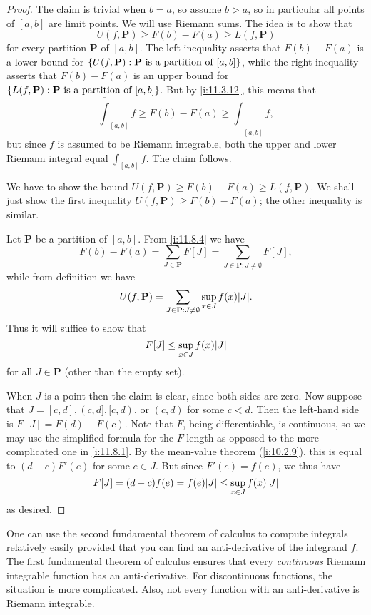 \begin{proof}
  The claim is trivial when \(b = a\), so assume \(b > a\), so in particular all points of \([a, b]\) are limit points.
  We will use Riemann sums.
  The idea is to show that
  \[
    U(f, \mathbf{P}) \geq F(b) - F(a) \geq L(f, \mathbf{P})
  \]
  for every partition \(\mathbf{P}\) of \([a, b]\).
  The left inequality asserts that \(F(b) - F(a)\) is a lower bound for \(\left\lbrace U(f, \mathbf{P}) : \mathbf{P} \text{ is a partition of } [a, b]\right\rbrace\), while the right inequality asserts that \(F(b) - F(a)\) is an upper bound for \(\left\lbrace L(f, \mathbf{P}) : \mathbf{P} \text{ is a partition of } [a, b]\right\rbrace\).
  But by \cref{i:11.3.12}, this means that
  \[
    \overline{\int}_{[a, b]} f \geq F(b) - F(a) \geq \underline{\int}_{[a, b]} f,
  \]
  but since \(f\) is assumed to be Riemann integrable, both the upper and lower Riemann integral equal \(\int_{[a, b]} f\).
  The claim follows.

  We have to show the bound \(U(f, \mathbf{P}) \geq F(b) - F(a) \geq L(f, \mathbf{P})\).
  We shall just show the first inequality \(U(f, \mathbf{P}) \geq F(b) - F(a)\);
  the other inequality is similar.

  Let \(\mathbf{P}\) be a partition of \([a, b]\).
  From \cref{i:11.8.4} we have
  \[
    F(b) - F(a) = \sum_{J \in \mathbf{P}} F[J] = \sum_{J \in \mathbf{P} : J \neq \emptyset} F[J],
  \]
  while from definition we have
  \[
    U(f, \mathbf{P}) = \sum_{J \in \mathbf{P} : J \neq \emptyset} \sup_{x \in J} f(x) \abs{J}.
  \]
  Thus it will suffice to show that
  \[
    F[J] \leq \sup_{x \in J} f(x) \abs{J}
  \]
  for all \(J \in \mathbf{P}\)
  (other than the empty set).

  When \(J\) is a point then the claim is clear, since both sides are zero.
  Now suppose that \(J = [c, d], (c, d], [c, d)\), or \((c, d)\) for some \(c < d\).
  Then the left-hand side is \(F[J] = F(d) - F(c)\).
  Note that \(F\), being differentiable, is continuous, so we may use the simplified formula for the \(F\)-length as opposed to the more complicated one in \cref{i:11.8.1}.
  By the mean-value theorem (\cref{i:10.2.9}), this is equal to \((d - c) F'(e)\) for some \(e \in J\).
  But since \(F'(e) = f(e)\), we thus have
  \[
    F[J] = (d - c) f(e) = f(e) \abs{J} \leq \sup_{x \in J} f(x) \abs{J}
  \]
  as desired.
\end{proof}

\begin{note}
  One can use the second fundamental theorem of calculus to compute integrals relatively easily provided that you can find an anti-derivative of the integrand \(f\).
  The first fundamental theorem of calculus ensures that every \emph{continuous} Riemann integrable function has an anti-derivative.
  For discontinuous functions, the situation is more complicated.
  Also, not every function with an anti-derivative is Riemann integrable.
\end{note}

